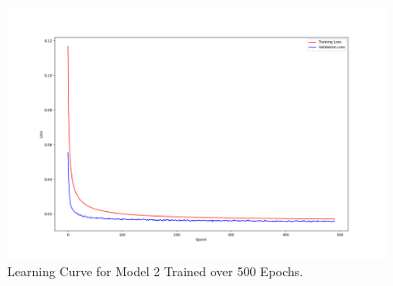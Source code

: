 \documentclass[12pt]{article}
\begin{document}
\begin{figure}[hp]
    \includegraphics[scale=0.35]{figures/learning_curve_2.png}
    \caption{Learning Curve for Model 2 Trained over 500 Epochs.}
    \label{fig:learning_curve_2}
\end{figure}
\end{document}
